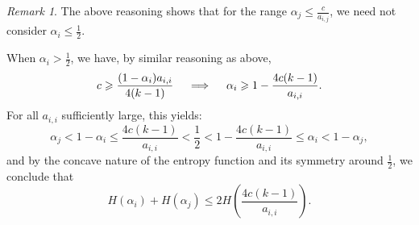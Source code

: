 \documentclass[11pt,reqno]{amsart}
\theoremstyle{definition}
\theoremstyle{remark}
\newtheorem{rem}[theorem]{Remark}
\theoremstyle{conjecture}
\begin{document}
\begin{rem}\label{no_need_1}
The above reasoning shows that for the range $\alpha_{j} \leqslant \frac{c}{a_{i,j}}$, we need not consider $\alpha_{i} \leqslant \frac{1}{2}$. 
\end{rem} %

When $\alpha_{i} > \frac{1}{2}$, we have, by similar reasoning as above,
\begin{equation}\label{lower_bound_a_{i,i}_subcase_1_subsub_2}
c \geqslant \frac{(1-\alpha_{i}) a_{i,i}}{4(k-1)} \quad \implies \quad \alpha_{i} \geqslant 1 - \frac{4 c (k-1)}{a_{i,i}}.
\end{equation}
For all $a_{i,i}$ sufficiently large, this yields:
\begin{equation}\label{ineq_seq}
\alpha_{j} < 1 - \alpha_{i} \leqslant \frac{4c (k-1)}{a_{i,i}} < \frac{1}{2} < 1 - \frac{4 c (k-1)}{a_{i,i}} \leqslant \alpha_{i} < 1 - \alpha_{j},
\end{equation}
and by the concave nature of the entropy function and its symmetry around $\frac{1}{2}$, we conclude that
\begin{equation}\label{entropy_bound_subcase_1_subsub_2}
H(\alpha_{i}) + H(\alpha_{j}) \leqslant 2 H\left(\frac{4 c (k-1)}{a_{i,i}}\right).
\end{equation}
\end{document}
